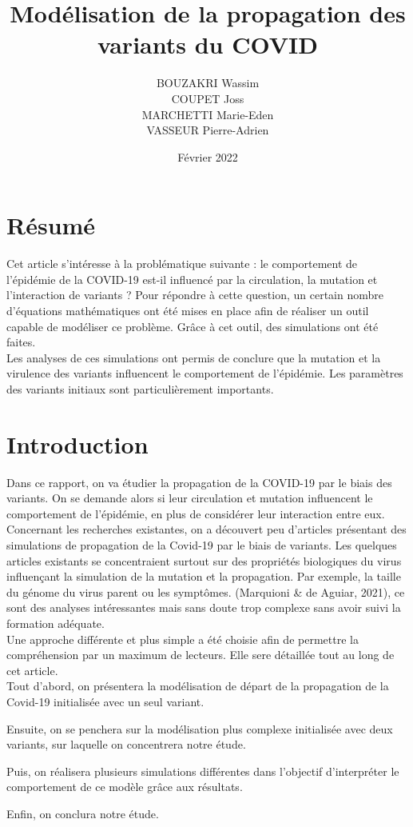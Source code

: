 \documentclass{article}
\title{Modélisation de la propagation des variants du COVID}
\author{BOUZAKRI Wassim \\COUPET Joss \\MARCHETTI Marie-Eden \\VASSEUR Pierre-Adrien}
\date{Février 2022}
\begin{document}
\maketitle

\section{Résumé}

Cet article s'intéresse à la problématique suivante : le comportement de l'épidémie de la COVID-19 est-il influencé par la circulation, la mutation et l'interaction de variants ?
Pour répondre à cette question, un certain nombre d'équations mathématiques ont été mises en place afin de réaliser un outil capable de modéliser ce problème. Grâce à cet outil, des simulations ont été faites. \\
Les analyses de ces simulations ont permis de conclure que la mutation et la virulence des variants influencent le comportement de l'épidémie. Les paramètres des variants initiaux sont particulièrement importants.

\section{Introduction}

Dans ce rapport, on va étudier la propagation de la COVID-19 par le biais des variants.
On se demande alors si leur circulation et mutation influencent le comportement de l'épidémie, en plus de considérer leur interaction entre eux.\\
\noindent
Concernant les recherches existantes, on a découvert peu d'articles présentant des simulations de propagation de la Covid-19 par le biais de variants.
Les quelques articles existants se concentraient surtout sur des propriétés biologiques du virus influençant la simulation de la mutation et la propagation.
Par exemple, la taille du génome du virus parent ou les symptômes. (Marquioni \& de Aguiar, 2021), ce sont des analyses intéressantes mais sans doute trop complexe sans avoir suivi la formation adéquate.\\
\noindent
Une approche différente et plus simple a été choisie afin de permettre la compréhension par un maximum de lecteurs. Elle sere détaillée tout au long de cet article.\\
\noindent
Tout d'abord, on présentera la modélisation de départ de la propagation de la Covid-19 initialisée avec un seul variant. \par
\noindent
Ensuite, on se penchera sur la modélisation plus complexe initialisée avec deux variants, sur laquelle on concentrera notre étude.\par
\noindent
Puis, on réalisera plusieurs simulations différentes dans l'objectif d'interpréter le comportement de ce modèle grâce aux résultats.\par
\noindent
Enfin, on conclura notre étude.\\
\end{document}
